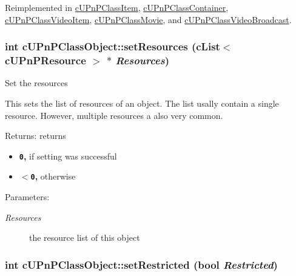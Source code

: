 Reimplemented in \hyperlink{classcUPnPClassItem_ab17057659c17792a5b67f4297ade642}{cUPnPClassItem}, \hyperlink{classcUPnPClassContainer_488761ebb4f074ded0d5374f862a1b54}{cUPnPClassContainer}, \hyperlink{classcUPnPClassVideoItem_3cbda6d87f5a9ff0475a75e76ba19924}{cUPnPClassVideoItem}, \hyperlink{classcUPnPClassMovie_d7f990edda85f2caabe822d2ceeb2b0d}{cUPnPClassMovie}, and \hyperlink{classcUPnPClassVideoBroadcast_ce7a341834e448479d3c8f4f0254ce43}{cUPnPClassVideoBroadcast}.\hypertarget{classcUPnPClassObject_18856f1b0320713a754a87f66b62396e}{
\subsubsection[{setResources}]{\setlength{\rightskip}{0pt plus 5cm}int cUPnPClassObject::setResources (cList$<$ {\bf cUPnPResource} $>$ $\ast$ {\em Resources})}}
\label{classcUPnPClassObject_18856f1b0320713a754a87f66b62396e}


Set the resources

This sets the list of resources of an object. The list usally contain a single resource. However, multiple resources a also very common.

\begin{Desc}
\item[Returns:]returns\begin{itemize}
\item {\bf {\tt 0},} if setting was successful\item {\bf {\tt $<$0},} otherwise \end{itemize}
\end{Desc}
\begin{Desc}
\item[Parameters:]
\begin{description}
\item[{\em Resources}]the resource list of this object \end{description}
\end{Desc}
\hypertarget{classcUPnPClassObject_40819ea39a75fc93e8c8a2ffde43732d}{
\subsubsection[{setRestricted}]{\setlength{\rightskip}{0pt plus 5cm}int cUPnPClassObject::setRestricted (bool {\em Restricted})}}
\label{classcUPnPClassObject_40819ea39a75fc93e8c8a2ffde43732d}


